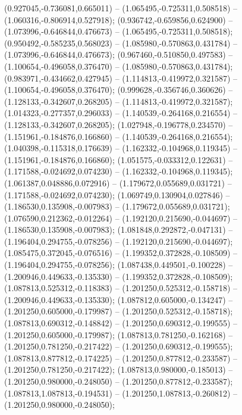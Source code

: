  (0.927045,-0.736081,0.665011) -- (1.065495,-0.725311,0.508518) -- (1.060316,-0.806914,0.527918);
 (0.936742,-0.659856,0.624900) -- (1.073996,-0.646844,0.476673) -- (1.065495,-0.725311,0.508518);
 (0.950492,-0.585235,0.568023) -- (1.085980,-0.570863,0.431784) -- (1.073996,-0.646844,0.476673);
 (0.967460,-0.510850,0.497583) -- (1.100654,-0.496058,0.376470) -- (1.085980,-0.570863,0.431784);
 (0.983971,-0.434662,0.427945) -- (1.114813,-0.419972,0.321587) -- (1.100654,-0.496058,0.376470);
 (0.999628,-0.356746,0.360626) -- (1.128133,-0.342607,0.268205) -- (1.114813,-0.419972,0.321587);
 (1.014323,-0.277357,0.296033) -- (1.140539,-0.264168,0.216554) -- (1.128133,-0.342607,0.268205);
 (1.027948,-0.196778,0.234570) -- (1.151961,-0.184876,0.166860) -- (1.140539,-0.264168,0.216554);
 (1.040398,-0.115318,0.176639) -- (1.162332,-0.104968,0.119345) -- (1.151961,-0.184876,0.166860);
 (1.051575,-0.033312,0.122631) -- (1.171588,-0.024692,0.074230) -- (1.162332,-0.104968,0.119345);
 (1.061387,0.048886,0.072916) -- (1.179672,0.055689,0.031721) -- (1.171588,-0.024692,0.074230);
 (1.069749,0.130904,0.027846) -- (1.186530,0.135908,-0.007983) -- (1.179672,0.055689,0.031721);
 (1.076590,0.212362,-0.012264) -- (1.192120,0.215690,-0.044697) -- (1.186530,0.135908,-0.007983);
 (1.081848,0.292872,-0.047131) -- (1.196404,0.294755,-0.078256) -- (1.192120,0.215690,-0.044697);
 (1.085475,0.372045,-0.076516) -- (1.199352,0.372828,-0.108509) -- (1.196404,0.294755,-0.078256);
 (1.087438,0.449501,-0.100228) -- (1.200946,0.449633,-0.135330) -- (1.199352,0.372828,-0.108509);
 (1.087813,0.525312,-0.118383) -- (1.201250,0.525312,-0.158718) -- (1.200946,0.449633,-0.135330);
 (1.087812,0.605000,-0.134247) -- (1.201250,0.605000,-0.179987) -- (1.201250,0.525312,-0.158718);
 (1.087813,0.690312,-0.148842) -- (1.201250,0.690312,-0.199555) -- (1.201250,0.605000,-0.179987);
 (1.087813,0.781250,-0.162168) -- (1.201250,0.781250,-0.217422) -- (1.201250,0.690312,-0.199555);
 (1.087813,0.877812,-0.174225) -- (1.201250,0.877812,-0.233587) -- (1.201250,0.781250,-0.217422);
 (1.087813,0.980000,-0.185013) -- (1.201250,0.980000,-0.248050) -- (1.201250,0.877812,-0.233587);
 (1.087813,1.087813,-0.194531) -- (1.201250,1.087813,-0.260812) -- (1.201250,0.980000,-0.248050);
